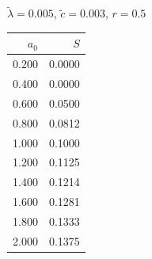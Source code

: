 \documentclass[11pt,a4paper,dvipsnames,twosided]{article}
\begin{document}
\begin{minipage}[t]{\textwidth}
\begin{minipage}[t]{0.32\textwidth}
        \footnotesize
        \begin{flushleft}$\tilde{\lambda}=0.005$, $\tilde{c}=0.003$, $r=0.5$\end{flushleft}
        \begin{tabular}[t]{rr}
            $a_0$ & $S$ \\
            \hline
             0.200 & 0.0000 \\
             0.400 & 0.0000 \\
             0.600 & 0.0500 \\
             0.800 & 0.0812 \\
             1.000 & 0.1000 \\
             1.200 & 0.1125 \\
             1.400 & 0.1214 \\
             1.600 & 0.1281 \\
             1.800 & 0.1333 \\
             2.000 & 0.1375 \\
        \end{tabular}
    \end{minipage}
\end{minipage}
\end{document}
